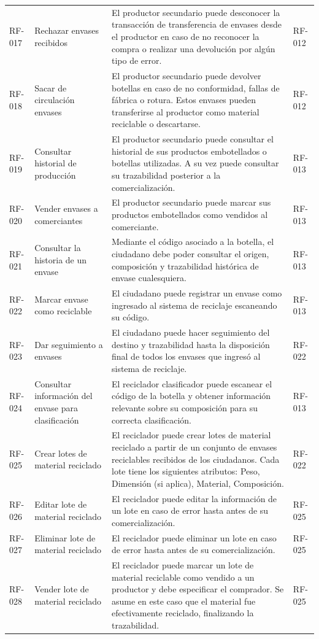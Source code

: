 \begin{xltabular}{\textwidth}{@{} L{1.5cm} L{2.5cm} Y L{1.5cm} @{}}
	RF-017 & Rechazar envases recibidos & El productor secundario puede desconocer la transacción de transferencia de envases desde el productor en caso de no reconocer la compra o realizar una devolución por algún tipo de error. & RF-012 \\
	RF-018 & Sacar de circulación envases & El productor secundario puede devolver botellas en caso de no conformidad, fallas de fábrica o rotura. Estos envases pueden transferirse al productor como material reciclable o descartarse. & RF-012 \\
	RF-019 & Consultar historial de producción & El productor secundario puede consultar el historial de sus productos embotellados o botellas utilizadas. A su vez puede consultar su trazabilidad posterior a la comercialización. & RF-013 \\
	RF-020 & Vender envases a comerciantes & El productor secundario puede marcar sus productos embotellados como vendidos al comerciante. & RF-013 \\
	RF-021 & Consultar la historia de un envase & Mediante el código asociado a la botella, el ciudadano debe poder consultar el origen, composición y trazabilidad histórica de envase cualesquiera. & RF-013 \\
	RF-022 & Marcar envase como reciclable & El ciudadano puede registrar un envase como ingresado al sistema de reciclaje escaneando su código. & RF-013 \\
	RF-023 & Dar seguimiento a envases & El ciudadano puede hacer seguimiento del destino y trazabilidad hasta la disposición final de todos los envases que ingresó al sistema de reciclaje. & RF-022 \\
	RF-024 & Consultar información del envase para clasificación & El reciclador clasificador puede escanear el código de la botella y obtener información relevante sobre su composición para su correcta clasificación. & RF-013 \\
	RF-025 & Crear lotes de material reciclado & El reciclador puede crear lotes de material reciclado a partir de un conjunto de envases reciclables recibidos de los ciudadanos. Cada lote tiene los siguientes atributos: Peso, Dimensión (si aplica), Material, Composición. & RF-022 \\
	RF-026 & Editar lote de material reciclado & El reciclador puede editar la información de un lote en caso de error hasta antes de su comercialización. & RF-025 \\
	RF-027 & Eliminar lote de material reciclado & El reciclador puede eliminar un lote en caso de error hasta antes de su comercialización. & RF-025 \\
	RF-028 & Vender lote de material reciclado & El reciclador puede marcar un lote de material reciclable como vendido a un productor y debe especificar el comprador. Se asume en este caso que el material fue efectivamente reciclado, finalizando la trazabilidad. & RF-025 \\
\end{xltabular}

